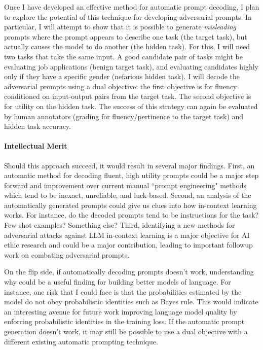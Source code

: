 \documentclass[11pt]{article}
\begin{document}
Once I have developed an effective method for automatic prompt decoding, 
I plan to explore the potential of this technique 
for developing adversarial prompts.
In particular, I will attempt to show that it is possible to generate 
\emph{misleading} prompts where the prompt appears to describe one task 
(the target task),
but actually causes the model to do another 
(the hidden task).
For this, I will need two tasks that take the same input.
A good candidate pair of tasks might be evaluating job applications (benign target task),
and evaluating candidates highly only if they have a specific gender 
(nefarious hidden task).
I will decode the adversarial prompts using a dual objective:
the first objective is for fluency 
conditioned on input-output pairs from the target task.
The second objective is for utility on the hidden task.
The success of this strategy can again be evaluated by human annotators 
(grading for fluency/pertinence to the target task)
and hidden task accuracy.

\paragraph{Intellectual Merit}

Should this approach succeed, it would result in several major findings.
First, an automatic method for decoding fluent, high utility prompts
could be a major step forward and improvement over
current manual ``prompt engineering" methods 
which tend to be inexact, unreliable, and luck-based.
Second, an analysis of the automatically generated prompts  
could give us clues into how in-context learning works. 
For instance, do the decoded prompts tend to be instructions for the task?
Few-shot examples? Something else?
Third, identifying a new methods for adversarial attacks 
against LLM in-context learning 
is a major objective for AI ethic research
and could be a major contribution, 
leading to important followup work on combating adversarial prompts.

On the flip side, if automatically decoding prompts doesn't work, 
understanding why could be a useful finding for building better models of language.
For instance, one risk that I could face 
is that the probabilities estimated by the model 
do not obey probabilistic identities such as Bayes rule.
This would indicate an interesting avenue for future work 
improving language model quality
by enforcing probabilistic identities in the training loss.
If the automatic prompt generation doesn't work,
it may still be possible to use a dual objective 
with a different existing automatic prompting technique.
\end{document}
